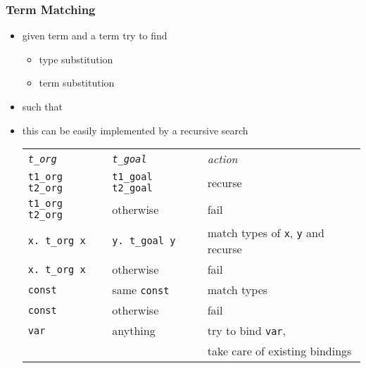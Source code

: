 \begin{frame}
\frametitle{Term Matching}
\begin{itemize}
\item given term  and a term  try to find
\begin{itemize}
\item type substitution 
\item term substitution 
\end{itemize}
\item such that  
\item this can be easily implemented by a recursive search
\bigskip

{\small
\begin{tabular}{lll}
\emph{\texttt{t\_org}} & \emph{\texttt{t\_goal}} & \emph{action} \\
\texttt{t1\_org t2\_org} & \texttt{t1\_goal t2\_goal} & recurse \\
\texttt{t1\_org t2\_org} & otherwise & fail \\
\texttt{\textbsl{}x.\ t\_org x} & \texttt{\textbsl{}y.\ t\_goal y} & match types of \texttt{x}, \texttt{y} and recurse \\
\texttt{\textbsl{}x.\ t\_org x} & otherwise & fail \\
\texttt{const} & same \texttt{const} & match types \\
\texttt{const} & otherwise & fail \\
\texttt{var} & anything & try to bind \texttt{var}, \\ & & take care of existing bindings
\end{tabular}
}
\end{itemize}
\end{frame}




